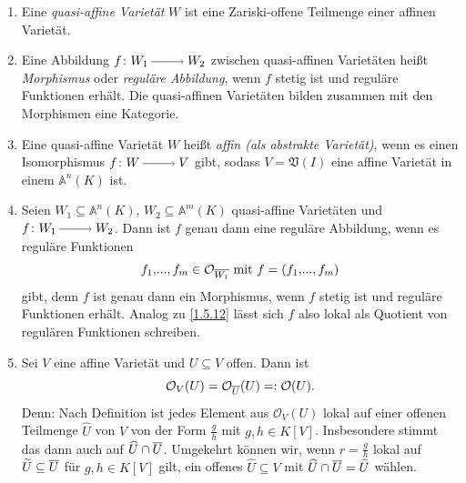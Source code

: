 \documentclass[a4paper,12pt,index=toc]{scrbook}
\theoremstyle{keinenummern} %
\def\A{\mathbb{A}}
\def\V{\mathfrak{V}}
\def\O{\mathcal{O}}
\renewcommand{\dotsc}{\ensuremath{\!...}}
\newcommand{\schlange}[1]{\widetilde{#1}}
\newcommand{\dach}{\widehat}
\def\Bar#1{\ensuremath\overline{#1}}
\begin{document}
\begin{db}\label{1.5.14}
  \begin{enumerate}
  \item{} Eine \emph{quasi-affine Varietät} $W$ ist eine Zariski-offene Teilmenge einer affinen Varietät.
  \item{} Eine Abbildung $f\colon W_1\ra W_2$ zwischen quasi-affinen Varietäten heißt \emph{Morphismus} oder \emph{reguläre Abbildung}, wenn $f$
    stetig ist und reguläre Funktionen erhält. Die quasi-affinen Varietäten bilden zusammen mit den Morphismen eine Kategorie.
  \item{} Eine quasi-affine Varietät $W$ heißt \emph{affin (als abstrakte Varietät)}, wenn es einen Isomorphismus
    $f\colon W\ra V$ gibt, sodass $V=\V(I)$ eine affine Varietät in einem $\A^n(K)$ ist.
    \item{} Seien $W_{1}\subseteq\A^{n}(K)$, $W_{2}\subseteq\A^{m}(K)$ quasi-affine Varietäten und $f\colon W_{1}\ra W_{2}$. Dann ist $f$ genau dann eine reguläre Abbildung, wenn es reguläre Funktionen 
    \[f_{1},\dotsc,f_{m}\in\O_{\Bar{W_{1}}}\text{ mit }f=(f_{1},\dotsc,f_{m})\]
    gibt, denn $f$ ist genau dann ein Morphismus, wenn $f$ stetig ist und reguläre Funktionen erhält. Analog zu \cref{1.5.12} lässt sich $f$ also lokal als Quotient von regulären Funktionen schreiben. 
    \item Sei $V$ eine affine Varietät und $U\subseteq V$ offen. Dann ist
    \[\O_{V}(U)=\O_{\Bar{U}}(U)=:\O(U).\]
    Denn: Nach Definition ist jedes Element aus $\O_{V}(U)$ lokal auf einer offenen Teilmenge $\dach{U}$ von $V$ von der Form $\frac{g}{h}$ mit $g,h\in K[V]$. Insbesondere stimmt das dann auch auf $\dach{U}\cap\Bar{U}$. Umgekehrt können wir, wenn $r=\frac{g}{h}$ lokal auf $\schlange{U}\subseteq\Bar{U}$ für $g,h\in K[V]$ gilt, ein offenes $\dach{U}\subseteq V$ mit $\dach{U}\cap\Bar{U}=\schlange{U}$ wählen.
  \end{enumerate}
\end{db}
\end{document}
